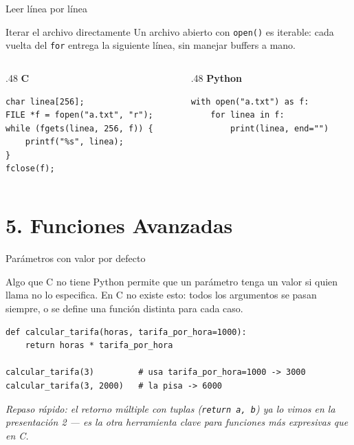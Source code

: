 \documentclass{beamer}
\begin{document}
\begin{frame}[fragile]{Leer línea por línea}
  \begin{block}{Iterar el archivo directamente}
    Un archivo abierto con \texttt{open()} es iterable: cada vuelta del
    \texttt{for} entrega la siguiente línea, sin manejar buffers a mano.
  \end{block}
  \begin{columns}[T]
    \begin{column}{.48\textwidth}
      \centering\textbf{C}
      \begin{verbatim}
char linea[256];
FILE *f = fopen("a.txt", "r");
while (fgets(linea, 256, f)) {
    printf("%s", linea);
}
fclose(f);
      \end{verbatim}
    \end{column}
    \begin{column}{.48\textwidth}
      \centering\textbf{Python}
      \begin{verbatim}
with open("a.txt") as f:
    for linea in f:
        print(linea, end="")
      \end{verbatim}
    \end{column}
  \end{columns}
\end{frame}

\section{5. Funciones Avanzadas}

\begin{frame}[fragile]{Parámetros con valor por defecto}
  \begin{block}{Algo que C no tiene}
    Python permite que un parámetro tenga un valor si quien llama no lo
    especifica. En C no existe esto: todos los argumentos se pasan
    siempre, o se define una función distinta para cada caso.
  \end{block}
  \begin{verbatim}
def calcular_tarifa(horas, tarifa_por_hora=1000):
    return horas * tarifa_por_hora

calcular_tarifa(3)         # usa tarifa_por_hora=1000 -> 3000
calcular_tarifa(3, 2000)   # la pisa -> 6000
  \end{verbatim}
  {\footnotesize \textit{Repaso rápido: el retorno múltiple con tuplas
  (\texttt{return a, b}) ya lo vimos en la presentación 2 — es la otra
  herramienta clave para funciones más expresivas que en C.}}
\end{frame}
\end{document}

